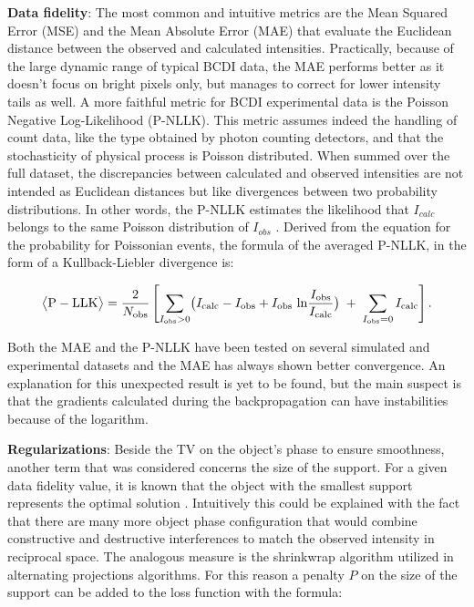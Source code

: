 \textbf{Data fidelity}: 
The most common and intuitive metrics are the Mean Squared Error (MSE) and the Mean Absolute Error (MAE) that evaluate 
the Euclidean distance between the observed and calculated intensities. Practically, because of the large dynamic range 
of typical BCDI data, the MAE performs better as it doesn't focus on bright pixels only, but manages to correct for lower 
intensity tails as well. 
A more faithful metric for BCDI experimental data is the Poisson Negative Log-Likelihood (P-NLLK). This metric assumes 
indeed the handling of count data, like the type obtained by photon counting detectors, and that the stochasticity of physical 
process is Poisson distributed. When summed over the full dataset, the discrepancies between calculated and observed 
intensities are not intended as Euclidean distances but like divergences between two probability distributions. In other 
words, the P-NLLK estimates the likelihood that $I_{calc}$ belongs to the same Poisson distribution of $I_{obs}$ \cite{Thibault_2012}. 
Derived from the equation for the probability for Poissonian events, the formula of the averaged P-NLLK, in the form of 
a Kullback-Liebler divergence is: 

\begin{equation}
    \bigl\langle \mathrm{P-LLK}\bigr\rangle
    = \frac{2}{N_{\mathrm{obs}}}
    \left[
      \sum_{I_{\rm obs}>0}
        \bigl(
          I_{\rm calc} - I_{\rm obs}
          + I_{\rm obs}\,\ln\!\frac{I_{\rm obs}}{I_{\rm calc}}
        \bigr)
      \;+\;
      \sum_{I_{\rm obs}=0} I_{\rm calc}
    \right].
\end{equation}
    

Both the MAE and the P-NLLK have been tested on several simulated and experimental datasets and the MAE has always shown 
better convergence. An explanation for this unexpected result is yet to be found, but the main suspect is that the gradients 
calculated during the backpropagation can have instabilities because of the logarithm. 

\textbf{Regularizations}:
Beside the TV on the object's phase to ensure smoothness, another term that was considered concerns the size of the support. 
For a given data fidelity value, it is known that the object with the smallest support represents the optimal solution 
\cite{favre-nicolin_free_2020}. Intuitively this could be explained with the fact that there are many more object phase configuration 
that would combine constructive and destructive interferences to match the observed intensity in reciprocal space. 
The analogous measure is the shrinkwrap algorithm \cite{Marchesini_shrinkwrap} utilized in alternating projections algorithms.  
For this reason a penalty $P$ on the size of the support can be added to the loss function with the formula: 

